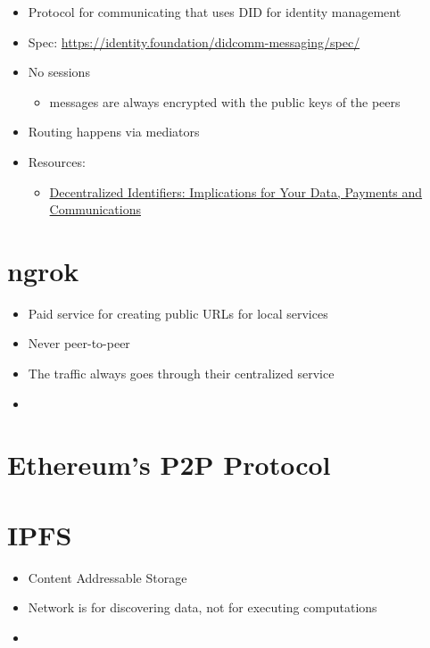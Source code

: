 \begin{itemize}
\tightlist
\item
  Protocol for communicating that uses DID for identity management
\item
  Spec: \url{https://identity.foundation/didcomm-messaging/spec/}
\item
  No sessions

  \begin{itemize}
  \tightlist
  \item
    messages are always encrypted with the public keys of the peers
  \end{itemize}
\item
  Routing happens via mediators
\item
  Resources:

  \begin{itemize}
  \tightlist
  \item
    \href{https://newsletter.impervious.ai/decentralized-identifiers-implications-for-your-data-payments-and-communications-2/}{Decentralized
    Identifiers: Implications for Your Data, Payments and
    Communications}
  \end{itemize}
\end{itemize}

\hypertarget{ngrok}{%
\section{ngrok}\label{ngrok}}

\begin{itemize}
\tightlist
\item
  Paid service for creating public URLs for local services
\item
  Never peer-to-peer
\item
  The traffic always goes through their centralized service
\item
\end{itemize}

\hypertarget{ethereums-p2p-protocol}{%
\section{Ethereum's P2P Protocol}\label{ethereums-p2p-protocol}}

\hypertarget{ipfs}{%
\section{IPFS}\label{ipfs}}

\begin{itemize}
\tightlist
\item
  Content Addressable Storage
\item
  Network is for discovering data, not for executing computations
\item
\end{itemize}


